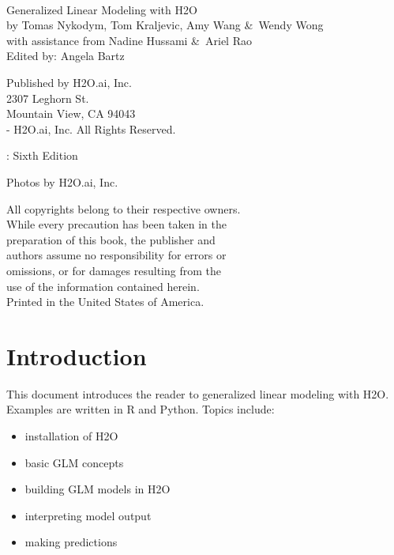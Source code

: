 \newpage
\restoregeometry

\null\vfill %

\thispagestyle{empty}%


{\raggedright\vfill\ 

Generalized Linear Modeling with H2O\\

by Tomas Nykodym, Tom Kraljevic, Amy Wang \&\ Wendy Wong \\ 
with assistance from Nadine Hussami \&\ Ariel Rao \\
Edited by: Angela Bartz

\bigskip
  Published by H2O.ai, Inc. \\
2307 Leghorn St. \\
Mountain View, CA 94043\\
\bigskip
{}-\the\year \hspace{1pt} H2O.ai, Inc. All Rights Reserved. 
\bigskip

\monthname \hspace{1pt}  \the\year: Sixth Edition
\bigskip

Photos by \textcopyright H2O.ai, Inc.
\bigskip

All copyrights belong to their respective owners.\\
While every precaution has been taken in the\\
preparation of this book, the publisher and\\
authors assume no responsibility for errors or\\
omissions, or for damages resulting from the\\
use of the information contained herein.\\
\bigskip
Printed in the United States of America. 
}

\newpage
\thispagestyle{empty}%
\tableofcontents
\thispagestyle{empty}%



\newpage

\section{Introduction}
This document introduces the reader to generalized linear modeling with H2O.  Examples are written in R and Python.
Topics include: 
\begin{itemize}
\item installation of H2O
\item basic GLM concepts
\item building GLM models in H2O
\item interpreting model output
\item making predictions
\end{itemize}

